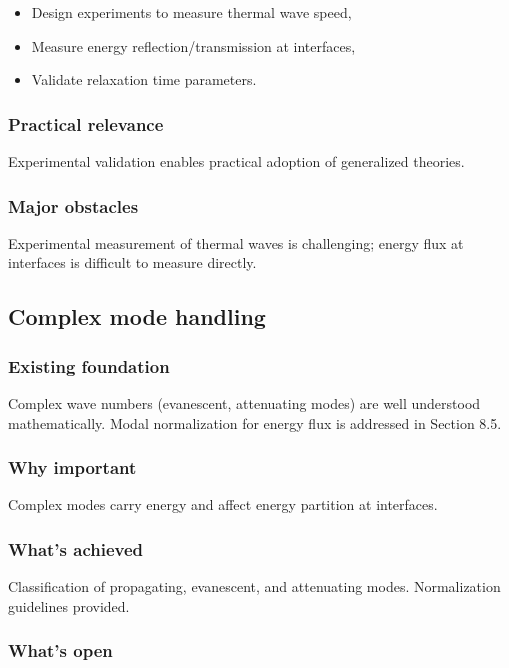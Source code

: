\begin{itemize}
\item Design experiments to measure thermal wave speed,
\item Measure energy reflection/transmission at interfaces,
\item Validate relaxation time parameters.
\end{itemize}

\subsubsection{Practical relevance}

Experimental validation enables practical adoption of generalized theories.

\subsubsection{Major obstacles}

Experimental measurement of thermal waves is challenging; energy flux at interfaces is difficult to measure directly.

\subsection{Complex mode handling}
\label{sec:15.5}

\subsubsection{Existing foundation}

Complex wave numbers (evanescent, attenuating modes) are well understood mathematically. Modal normalization for energy flux is addressed in Section 8.5.

\subsubsection{Why important}

Complex modes carry energy and affect energy partition at interfaces.

\subsubsection{What's achieved}

Classification of propagating, evanescent, and attenuating modes. Normalization guidelines provided.

\subsubsection{What's open}

